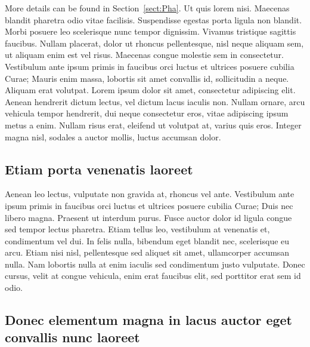 \documentclass[eprint]{actapoly}
\begin{document}
More details can be found in Section~\ref{sect:Pha}.
Ut quis lorem nisi.
Maecenas blandit pharetra odio vitae facilisis.
Suspendisse egestas porta ligula non blandit.
Morbi posuere leo scelerisque nunc tempor dignissim.
Vivamus tristique sagittis faucibus.
Nullam placerat, dolor ut rhoncus pellentesque, nisl neque aliquam sem, ut aliquam enim est vel risus.
Maecenas congue molestie sem in consectetur.
Vestibulum ante ipsum primis in faucibus orci luctus et ultrices posuere cubilia Curae;
 Mauris enim massa, lobortis sit amet convallis id, sollicitudin a neque.
Aliquam erat volutpat.
Lorem ipsum dolor sit amet, consectetur adipiscing elit.
Aenean hendrerit dictum lectus, vel dictum lacus iaculis non.
Nullam ornare, arcu vehicula tempor hendrerit, dui neque consectetur eros, vitae adipiscing ipsum metus a enim.
Nullam risus erat, eleifend ut volutpat at, varius quis eros.
Integer magna nisl, sodales a auctor mollis, luctus accumsan dolor.




\subsection{Etiam porta venenatis laoreet}




Aenean leo lectus, vulputate non gravida at, rhoncus vel ante.
Vestibulum ante ipsum primis in faucibus orci luctus et ultrices posuere cubilia Curae;
 Duis nec libero magna.
Praesent ut interdum purus.
Fusce auctor dolor id ligula congue sed tempor lectus pharetra.
Etiam tellus leo, vestibulum at venenatis et, condimentum vel dui.
In felis nulla, bibendum eget blandit nec, scelerisque eu arcu.
Etiam nisi nisl, pellentesque sed aliquet sit amet, ullamcorper accumsan nulla.
Nam lobortis nulla at enim iaculis sed condimentum justo vulputate.
Donec cursus, velit at congue vehicula, enim erat faucibus elit, sed porttitor erat sem id odio.





\subsection{Donec elementum magna in lacus auctor eget convallis nunc laoreet}
\end{document}
